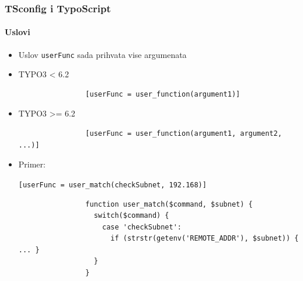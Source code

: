 \begin{frame}[fragile]
	\frametitle{TSconfig i TypoScript}
	\framesubtitle{Uslovi}

	\begin{itemize}
		\item Uslov \texttt{userFunc} sada prihvata vise argumenata

		\item TYPO3 < 6.2
			\begin{lstlisting}
				[userFunc = user_function(argument1)]
			\end{lstlisting}

		\item TYPO3 >= 6.2
			\begin{lstlisting}
				[userFunc = user_function(argument1, argument2, ...)]
			\end{lstlisting}

		\item Primer:

			\lstinline![userFunc = user_match(checkSubnet, 192.168)]!

			\begin{lstlisting}
				function user_match($command, $subnet) {
				  switch($command) {
				    case 'checkSubnet':
				      if (strstr(getenv('REMOTE_ADDR'), $subnet)) { ... }
				  }
				}
			\end{lstlisting}

	\end{itemize}

\end{frame}


